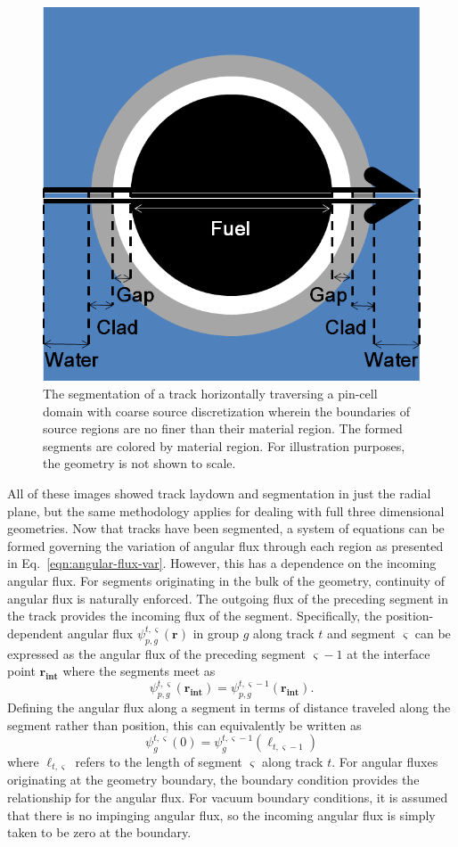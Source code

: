\begin{figure}[h!]
	\centering
	\includegraphics[width=0.6\linewidth]{figures/segmentation.PNG}
	\caption[]{The segmentation of a track horizontally traversing a pin-cell domain with coarse source discretization wherein the boundaries of source regions are no finer than their material region. The formed segments are colored by material region. For illustration purposes, the geometry is not shown to scale.}
	\label{fig:segmentation}
\end{figure}

All of these images showed track laydown and segmentation in just the radial plane, but the same methodology applies for dealing with full three dimensional geometries. Now that tracks have been segmented, a system of equations can be formed governing the variation of angular flux through each region as presented in Eq.~\ref{eqn:angular-flux-var}. However, this has a dependence on the incoming angular flux. For segments originating in the bulk of the geometry, continuity of angular flux is naturally enforced. The outgoing flux of the preceding segment in the track provides the incoming flux of the segment. Specifically, the position-dependent angular flux $\psi_{p,g}^{t,\varsigma}(\mathbf{r})$ in group $g$ along track $t$ and segment $\varsigma$ can be expressed as the angular flux of the preceding segment $\varsigma-1$ at the interface point $\mathbf{r_{\textbf{int}}}$ where the segments meet as
\begin{dmath}
	\psi_{p,g}^{t,\varsigma}(\mathbf{r_{\textbf{int}}}) = \psi_{p,g}^{t,\varsigma-1}(\mathbf{r_{\textbf{int}}}).
\end{dmath}
Defining the angular flux along a segment in terms of distance traveled along the segment rather than position, this can equivalently be written as
\begin{dmath}
	\psi_g^{t,\varsigma}(0) = \psi_g^{t,\varsigma-1}(\ell_{t,\varsigma-1})
	\label{eqn:angular_flux_boundary}
\end{dmath}
where $\ell_{t,\varsigma}$ refers to the length of segment $\varsigma$ along track $t$. For angular fluxes originating at the geometry boundary, the boundary condition provides the relationship for the angular flux. For vacuum boundary conditions, it is assumed that there is no impinging angular flux, so the incoming angular flux is simply taken to be zero at the boundary. 

